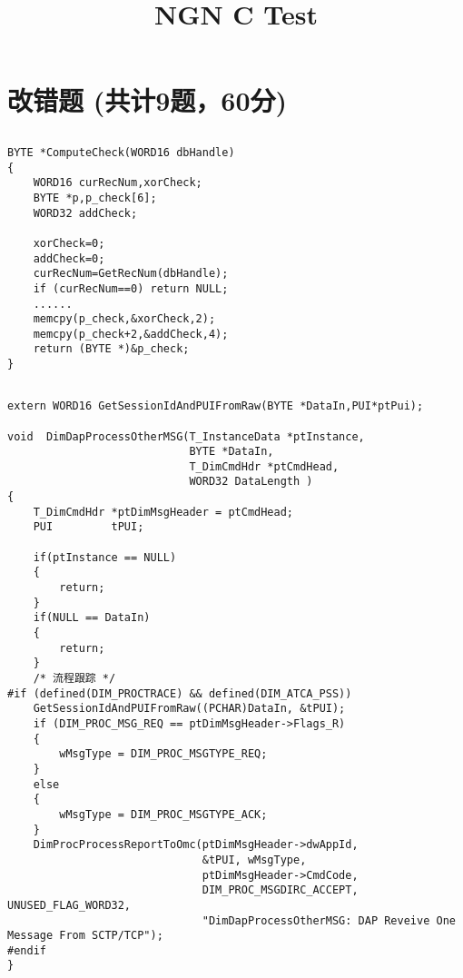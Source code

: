 ﻿\documentclass  [11pt,twocolumn]{article}
\title{NGN C Test}
\author{}
\date{}
\begin{document}
\begin{minipage}{0.9\linewidth}
\end{minipage}


\section{改错题 (共计9题，60分)}
\subsection{}
\begin{lstlisting}
BYTE *ComputeCheck(WORD16 dbHandle)
{
    WORD16 curRecNum,xorCheck;
    BYTE *p,p_check[6];
    WORD32 addCheck;

    xorCheck=0;
    addCheck=0;
    curRecNum=GetRecNum(dbHandle);
    if (curRecNum==0) return NULL;
    ......
    memcpy(p_check,&xorCheck,2);
    memcpy(p_check+2,&addCheck,4);
    return (BYTE *)&p_check;
}
\end{lstlisting}
\subsection{}
\begin{lstlisting}
extern WORD16 GetSessionIdAndPUIFromRaw(BYTE *DataIn,PUI*ptPui);

void  DimDapProcessOtherMSG(T_InstanceData *ptInstance,
                            BYTE *DataIn,
                            T_DimCmdHdr *ptCmdHead,
                            WORD32 DataLength )
{
    T_DimCmdHdr *ptDimMsgHeader = ptCmdHead;
    PUI         tPUI;

    if(ptInstance == NULL)
    {
        return;
    }  
    if(NULL == DataIn)
    {
        return;
    }
    /* 流程跟踪 */
#if (defined(DIM_PROCTRACE) && defined(DIM_ATCA_PSS))
    GetSessionIdAndPUIFromRaw((PCHAR)DataIn, &tPUI);
    if (DIM_PROC_MSG_REQ == ptDimMsgHeader->Flags_R)
    {
        wMsgType = DIM_PROC_MSGTYPE_REQ;
    }
    else
    {
        wMsgType = DIM_PROC_MSGTYPE_ACK;
    }
    DimProcProcessReportToOmc(ptDimMsgHeader->dwAppId, 
                              &tPUI, wMsgType, 
                              ptDimMsgHeader->CmdCode,
                              DIM_PROC_MSGDIRC_ACCEPT, UNUSED_FLAG_WORD32,
                              "DimDapProcessOtherMSG: DAP Reveive One 
Message From SCTP/TCP");
#endif
}
\end{lstlisting}
\end{document}
